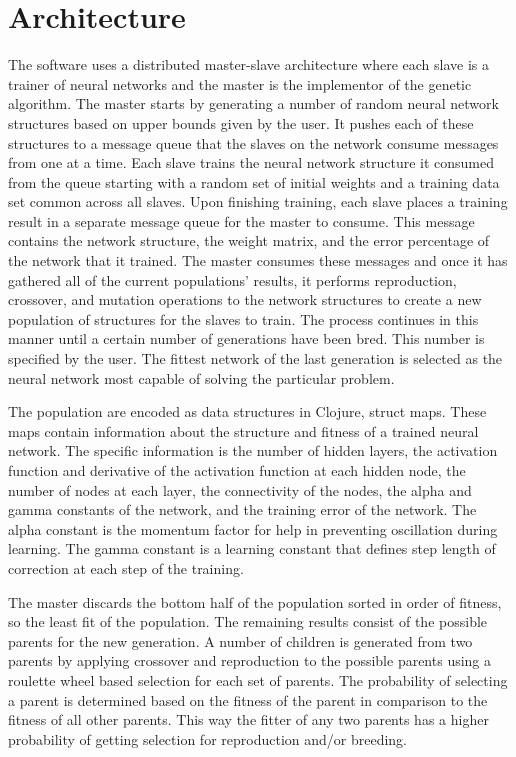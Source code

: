 \section{Architecture}
The software uses a distributed master-slave architecture where each slave is a trainer of neural networks and the master is the implementor of the genetic algorithm. The master starts by generating a number of random neural network structures based on upper bounds given by the user. It pushes each of these structures to a message queue that the slaves on the network consume messages from one at a time. Each slave trains the neural network structure it consumed from the queue starting with a random set of initial weights and a training data set common across all slaves. Upon finishing training, each slave places a training result in a separate message queue for the master to consume. This message contains the network structure, the weight matrix, and the error percentage of the network that it trained. The master consumes these messages and once it has gathered all of the current populations' results, it performs reproduction, crossover, and mutation operations to the network structures to create a new population of structures for the slaves to train. The process continues in this manner until a certain number of generations have been bred. This number is specified by the user. The fittest network of the last generation is selected as the neural network most capable of solving the particular problem.  

The population are encoded as data structures in Clojure, struct maps. These maps contain information about the structure and fitness of a trained neural network. The specific information is the number of hidden layers, the activation function and derivative of the activation function at each hidden node, the number of nodes at each layer, the connectivity of the nodes, the alpha and gamma constants of the network, and the training error of the network. The alpha constant is the momentum factor for help in preventing oscillation during learning. The gamma constant is a learning constant that defines step length of correction at each step of the training.

The master discards the bottom half of the population sorted in order of fitness, so the least fit of the population. The remaining results consist of the possible parents for the new generation. A number of children is generated from two parents by applying crossover and reproduction to the possible parents using a roulette wheel based selection for each set of parents. The probability of selecting a parent is determined based on the fitness of the parent in comparison to the fitness of all other parents. This way the fitter of any two parents has a higher probability of getting selection for reproduction and/or breeding.


